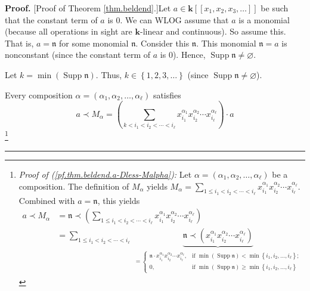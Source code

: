 \documentclass[numbers=enddot,12pt,final,onecolumn,notitlepage,abstracton]{scrartcl}%
\theoremstyle{definition}
\newenvironment{proof}[1][Proof]{\noindent\textbf{#1.} }{\ \rule{0.5em}{0.5em}}
\newenvironment{verlong}{}{}
\let\sumnonlimits\sum
\renewcommand{\sum}{\sumnonlimits\limits}
\begin{document}
\begin{proof}
[Proof of Theorem \ref{thm.beldend}.]Let $a\in\mathbf{k}\left[  \left[
x_{1},x_{2},x_{3},\ldots\right]  \right]  $ be such that the constant term of
$a$ is $0$. We can WLOG assume that $a$ is a monomial (because all operations
in sight are $\mathbf{k}$-linear and continuous). So assume this. That is,
$a=\mathfrak{n}$ for some monomial $\mathfrak{n}$. Consider this
$\mathfrak{n}$. This monomial $\mathfrak{n}=a$ is nonconstant (since the
constant term of $a$ is $0$). Hence, $\operatorname*{Supp}\mathfrak{n}%
\neq\varnothing$.

Let $k=\min\left(  \operatorname*{Supp}\mathfrak{n}\right)  $. Thus,
$k\in\left\{  1,2,3,\ldots\right\}  $ (since $\operatorname*{Supp}%
\mathfrak{n}\neq\varnothing$).

\begin{verlong}
Every composition $\alpha=\left(  \alpha_{1},\alpha_{2},\ldots,\alpha_{\ell
}\right)  $ satisfies%
\begin{equation}
a\left.  \prec\right.  M_{\alpha}=\left(  \sum_{k<i_{1}<i_{2}<\cdots<i_{\ell}%
}x_{i_{1}}^{\alpha_{1}}x_{i_{2}}^{\alpha_{2}}\cdots x_{i_{\ell}}^{\alpha
_{\ell}}\right)  \cdot a \label{pf.thm.beldend.a-Dless-Malpha}%
\end{equation}
\footnote{\textit{Proof of (\ref{pf.thm.beldend.a-Dless-Malpha}):} Let
$\alpha=\left(  \alpha_{1},\alpha_{2},\ldots,\alpha_{\ell}\right)  $ be a
composition. The definition of $M_{\alpha}$ yields $M_{\alpha}=\sum_{1\leq
i_{1}<i_{2}<\cdots<i_{\ell}}x_{i_{1}}^{\alpha_{1}}x_{i_{2}}^{\alpha_{2}}\cdots
x_{i_{\ell}}^{\alpha_{\ell}}$. Combined with $a=\mathfrak{n}$, this yields%
\begin{align*}
a\left.  \prec\right.  M_{\alpha}  &  =\mathfrak{n}\left.  \prec\right.
\left(  \sum_{1\leq i_{1}<i_{2}<\cdots<i_{\ell}}x_{i_{1}}^{\alpha_{1}}%
x_{i_{2}}^{\alpha_{2}}\cdots x_{i_{\ell}}^{\alpha_{\ell}}\right) \\
&  =\sum_{1\leq i_{1}<i_{2}<\cdots<i_{\ell}}\underbrace{\mathfrak{n}\left.
\prec\right.  \left(  x_{i_{1}}^{\alpha_{1}}x_{i_{2}}^{\alpha_{2}}\cdots
x_{i_{\ell}}^{\alpha_{\ell}}\right)  }_{\substack{=%
\begin{cases}
\mathfrak{n}\cdot x_{i_{1}}^{\alpha_{1}}x_{i_{2}}^{\alpha_{2}}\cdots
x_{i_{\ell}}^{\alpha_{\ell}}, & \text{if }\min\left(  \operatorname*{Supp}%
\mathfrak{n}\right)  <\min\left\{  i_{1},i_{2},\ldots,i_{\ell}\right\}  ;\\
0, & \text{if }\min\left(  \operatorname*{Supp}\mathfrak{n}\right)  \geq
\min\left\{  i_{1},i_{2},\ldots,i_{\ell}\right\}

\end{cases}}}
\end{align*}}
\end{verlong}
\end{proof}
\end{document}
